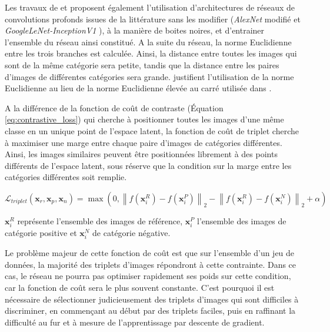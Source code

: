 Les travaux de \citeauthor{wang_learning_2014} \cite{wang_learning_2014} et \citeauthor{schroff_facenet_2015} \cite{schroff_facenet_2015} proposent également l'utilisation d'architectures de réseaux de convolutions profonds issues de la littérature sans les modifier (\textit{AlexNet} modifié \cite{zeiler_visualizing_2013} et \textit{GoogleLeNet-InceptionV1} \cite{szegedy_going_2014}), à la manière de boites noires, et d'entrainer l'ensemble du réseau ainsi constitué.
A la suite du réseau, la norme Euclidienne entre les trois branches est calculée.
Ainsi, la distance entre toutes les images qui sont de la même catégorie sera petite, tandis que la distance entre les paires d'images de différentes catégories sera grande.
\citeauthor{wu_sampling_2017} \cite{wu_sampling_2017} justifient l'utilisation de la norme Euclidienne au lieu de la norme Euclidienne élevée au carré utilisée dans \citeauthor{schroff_facenet_2015} \cite{schroff_facenet_2015}.

A la différence de la fonction de coût de contraste (Équation \ref{eq:contrastive_loss}) qui cherche à positionner toutes les images d'une même classe en un unique point de l'espace latent, la fonction de coût de triplet cherche à maximiser une marge entre chaque paire d'images de catégories différentes.
Ainsi, les images similaires peuvent être positionnées librement à des points différents de l'espace latent, sous réserve que la condition sur la marge entre les catégories différentes soit remplie.

\begin{equation} \label{eq:triplet_loss}
\mathcal{L}_{triplet}\left(\mathbf{x}_r, \mathbf{x}_p, \mathbf{x}_n\right) = \operatorname{max}\left(0,  \left\|f\left(\mathbf{x}_{i}^{R}\right)-f\left(\mathbf{x}_{i}^{P}\right)\right\|_{2}-\left\|f\left(\mathbf{x}_{i}^{R}\right)-f\left(\mathbf{x}_{i}^{N}\right)\right\|_{2} + \alpha\right)
\end{equation}

$\mathbf{x}_{i}^{R}$ représente l'ensemble des images de référence, $\mathbf{x}_{i}^{P}$ l'ensemble des images de catégorie positive et $\mathbf{x}_{i}^{N}$ de catégorie négative.

Le problème majeur de cette fonction de coût est que sur l'ensemble d'un jeu de données, la majorité des triplets d'images répondront à cette contrainte.
Dans ce cas, le réseau ne pourra pas optimiser rapidement ses poids sur cette condition, car la fonction de coût sera le plus souvent constante.
C'est pourquoi il est nécessaire de sélectionner judicieusement des triplets d'images qui sont difficiles à discriminer, en commençant au début par des triplets faciles, puis en raffinant la difficulté au fur et à mesure de l'apprentissage par descente de gradient.

